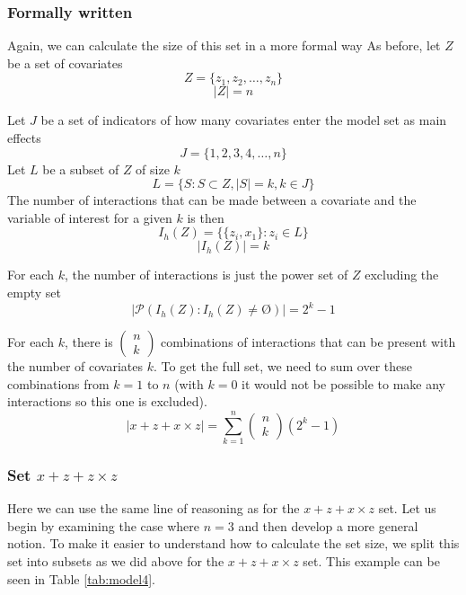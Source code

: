 \subsubsection{Formally written} Again, we can calculate the size of this set in a more formal way
As before, let $Z$ be a set of covariates 
\[Z=\{\left.z_1,z_2,\dots ,z_n\right.\}\] \[|Z|=n\] 

Let $J$ be a set of indicators of how many covariates enter the model set as main effects
\[J=\{\left.1,2,3,4,\dots ,n\right.\}\] 
Let $L$ be a subset of $Z$ of size $k$
\[L=\{\left.S:S\subset Z,\left|S\right|=k,k\in J\right.\}\] 
The number of interactions that can be made between a covariate and the variable of interest for a given $k$ is then
\[I_h\left(Z\right)=\{\{\left.\left.z_i,x_1\right.\}:z_i\in L\right.\}\] 
\[\left|I_h\left(Z\right)\right|=k\] 

For each $k$, the number of interactions is just the power set of $Z$ excluding the empty set
\[\left|\mathcal{P}\left(I_h\left(Z\right):I_h\left(Z\right)\neq \textrm{\O}\right)\right|=2^k-1\] 

For each $k$, there is $\left( \begin{array}{c}
n \\ 
k \end{array}
\right)$ combinations of interactions that can be present with the number of covariates $k$. To get the full set, we need to sum over these combinations from $k=1$ to $n$ (with $k=0$ it would not be possible to make any interactions so this one is excluded).
\[\left|x + z + x \times z\right|=\sum^n_{k=1}{\left( \begin{array}{c}
n \\ 
k \end{array}
\right)\left(2^k-1\right)}\] 

\subsubsection{Set $x + z + z \times z$}
Here we can use the same line of reasoning as for the $x + z + x \times z$ set. Let us begin by examining the case where $n=3$ and then develop a more general notion. To make it easier to understand how to calculate the set size, we split this set into subsets as we did above for the $x + z + x \times z$ set. This example can be seen in Table \ref{tab:model4}. 

